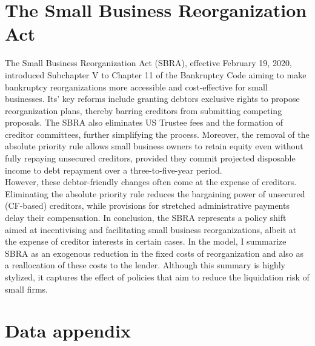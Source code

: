 \documentclass[12pt]{article}
\begin{document}
\section{The Small Business Reorganization Act \label{sec:A2}}

The Small Business Reorganization Act (SBRA), effective February 19, 2020, introduced Subchapter V to Chapter 11 of the Bankruptcy Code aiming to make bankruptcy reorganizations more accessible and cost-effective for small businesses. Its' key reforms include granting debtors exclusive rights to propose reorganization plans, thereby barring creditors from submitting competing proposals. The SBRA also eliminates US Trustee fees and the formation of creditor committees, further simplifying the process. Moreover, the removal of the absolute priority rule allows small business owners to retain equity even without fully repaying unsecured creditors, provided they commit projected disposable income to debt repayment over a three-to-five-year period. \vspace{3mm} \\
However, these debtor-friendly changes often come at the expense of creditors.  Eliminating the absolute priority rule reduces the bargaining power of unsecured (CF-based) creditors, while provisions for stretched administrative payments delay their compensation. In conclusion, the SBRA represents a policy shift aimed at incentivising and facilitating small business reorganizations, albeit at the expense of creditor interests in certain cases. In the model, I summarize SBRA as an exogenous reduction in the fixed costs of reorganization and also as a reallocation of these costs to the lender. Although this summary is highly stylized, it captures the effect of policies that aim to reduce the liquidation risk of small firms. 

\section{Data appendix \label{sec:A3}}
\end{document}
